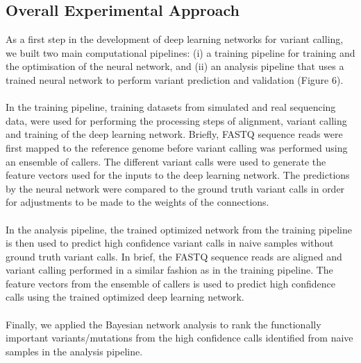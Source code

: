 \documentclass{article}
\begin{document}
\subsection{Overall Experimental Approach}
As a first step in the development of deep learning networks for variant calling, we  built two main computational pipelines: (i) a training pipeline for training and the optimisation of the neural network, and (ii) an analysis pipeline that uses a trained neural network to perform variant prediction and validation (Figure 6). \\\\
In the training pipeline, training datasets from simulated and real sequencing data, were used for  performing the processing steps of alignment, variant calling and training of the deep learning network. Briefly, FASTQ sequence reads were first mapped to the reference genome before variant calling was performed using an ensemble of callers. The different variant calls were used to generate the feature vectors used for the inputs to the deep learning network. The predictions by the neural network were compared to the ground truth variant calls in order for adjustments to be made to the weights of the connections.\\\\
 In the analysis pipeline, the trained optimized network from the training pipeline is then used to predict high confidence variant calls in naive samples without ground truth variant calls. In brief, the FASTQ sequence reads are aligned and variant calling performed in a similar fashion as in the training pipeline. The feature vectors from the ensemble of callers is used to predict high confidence calls using the trained optimized deep learning network.\\\\
 Finally, we applied the Bayesian network analysis to rank the functionally important variants/mutations from the high confidence calls identified from naive samples in the analysis pipeline.\\\\
\end{document}
